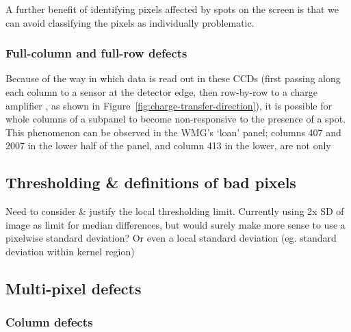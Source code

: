 \documentclass[\main/IO-Pixels.tex]{subfiles}
\begin{document}
A further benefit of identifying pixels affected by spots on the screen is that we can avoid classifying the pixels as individually problematic.

\subsubsection{Full-column and full-row defects}

Because of the way in which data is read out in these CCDs (first passing along each column to a sensor at the detector edge, then row-by-row to a charge amplifier , as shown in Figure~\ref{fig:charge-transfer-direction}), it is possible for whole columns of a subpanel to become non-responsive to the presence of a spot. This phenomenon can be observed in the WMG's `loan' panel; columns 407 and 2007 in the lower half of the panel, and column 413 in the lower, are not only 



\subsection{Thresholding \& definitions of bad pixels}

Need to consider \& justify the local thresholding limit. Currently using 2x SD of image as limit for median differences, but would surely make more sense to use a pixelwise standard deviation? Or even a local standard deviation (eg. standard deviation within kernel region)



\subsection{Multi-pixel defects}

\subsubsection{Column defects}

\label{sec:column-defects}

\end{document}
